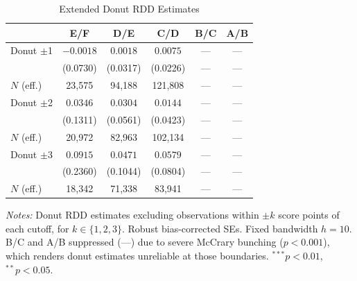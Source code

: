 \begin{table}[htbp]
\centering
\caption{Extended Donut RDD Estimates}
\label{tab:donut_extended}
\begin{tabular}{lccccc}
\toprule
 & E/F & D/E & C/D & B/C & A/B \\
\midrule
Donut $\pm$1 & $-0.0018$ & $0.0018$ & $0.0075$ & {---} & {---} \\
 & (0.0730) & (0.0317) & (0.0226) & {---} & {---} \\
\quad $N$ (eff.) & 23,575 & 94,188 & 121,808 & {---} & {---} \\
\addlinespace
Donut $\pm$2 & $0.0346$ & $0.0304$ & $0.0144$ & {---} & {---} \\
 & (0.1311) & (0.0561) & (0.0423) & {---} & {---} \\
\quad $N$ (eff.) & 20,972 & 82,963 & 102,134 & {---} & {---} \\
\addlinespace
Donut $\pm$3 & $0.0915$ & $0.0471$ & $0.0579$ & {---} & {---} \\
 & (0.2360) & (0.1044) & (0.0804) & {---} & {---} \\
\quad $N$ (eff.) & 18,342 & 71,338 & 83,941 & {---} & {---} \\
\bottomrule
\end{tabular}
\begin{minipage}{\textwidth}
\footnotesize
\textit{Notes:} Donut RDD estimates excluding observations within $\pm k$ score points
of each cutoff, for $k \in \{1, 2, 3\}$. Robust bias-corrected SEs. Fixed bandwidth $h = 10$.
B/C and A/B suppressed ({---}) due to severe McCrary bunching ($p < 0.001$), which renders
donut estimates unreliable at those boundaries.
$^{***}p<0.01$, $^{**}p<0.05$.
\end{minipage}
\end{table}
